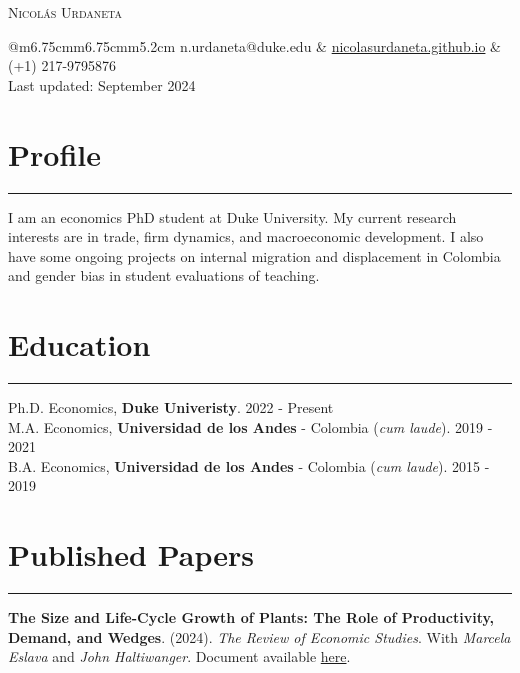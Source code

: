 \documentclass[12pt, letterpaper]{article}
\begin{document}
 

\begin{center}
{\Huge \textsc{Nicolás Urdaneta}}
\vspace*{5mm}

\begin{tabular}{@{}m{6.75cm}m{6.75cm}m{5.2cm}}
\noindent n.urdaneta@duke.edu & \href{nicolasurdaneta.github.io}{nicolasurdaneta.github.io} & (+1) 217-9795876 \\
Last updated: September 2024
\end{tabular}
\vspace*{-7mm}

\end{center}
\section*{Profile}
\vspace*{-8mm}
\noindent \rule{\linewidth}{0.2mm}
\noindent I am an economics PhD student at Duke University. My current research interests are in trade, firm dynamics, and macroeconomic development. I also have some ongoing projects on internal migration and displacement in Colombia and gender bias in student evaluations of teaching. 

\vspace*{-4mm}

\section*{Education}
\vspace*{-8mm}
\noindent \rule{\linewidth}{0.2mm}
\noindent
Ph.D. Economics, \textbf{Duke Univeristy}. \hfill 2022 - Present \\
M.A. Economics, \textbf{Universidad de los Andes} - Colombia (\textit{cum laude}). \hfill 2019 - 2021 \\
B.A. Economics, \textbf{Universidad de los Andes} - Colombia (\textit{cum laude}). \hfill 2015 - 2019

\vspace*{-2mm}

\section*{Published Papers}
\vspace*{-8mm}
\noindent \rule{\linewidth}{0.2mm}
\noindent \textbf{The Size and Life-Cycle Growth of Plants: The Role of Productivity, Demand, and Wedges}. (2024). \textit{The Review of Economic Studies}.   With \textit{Marcela Eslava} and \textit{John Haltiwanger}. Document available \href{https://academic.oup.com/restud/advance-article/doi/10.1093/restud/rdad029/7054272?login=true}{here}. \\ [-3mm]
\end{document}
